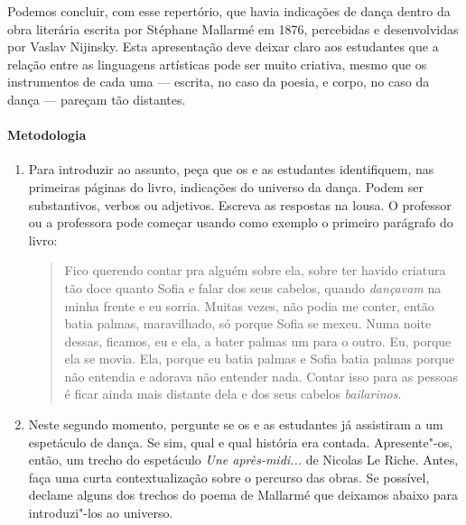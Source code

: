 \documentclass[12pt]{extarticle}
\begin{document}
Podemos concluir, com esse repertório, que havia indicações de dança dentro da
obra literária escrita por Stéphane Mallarmé em 1876, percebidas e desenvolvidas
por Vaslav Nijinsky. Esta apresentação deve deixar
claro aos estudantes que a relação entre as linguagens artísticas pode
ser muito criativa, mesmo que os instrumentos de cada uma --- escrita, no caso
da poesia, e corpo, no caso da dança --- pareçam tão distantes.

\paragraph{Metodologia}

\begin{enumerate}

  \item
  Para introduzir ao assunto, peça que os e as estudantes identifiquem, nas primeiras
  páginas do livro, indicações do universo da dança. Podem ser substantivos, verbos ou adjetivos. 
  Escreva as respostas na lousa. O professor ou a professora pode começar usando como exemplo
  o primeiro parágrafo do livro:

  \begin{quote}
  Fico querendo contar pra alguém sobre ela,
sobre ter havido criatura tão doce quanto Sofia e falar
dos seus cabelos, quando \emph{dançavam} na minha frente e
eu sorria. Muitas vezes, não podia me conter, então batia
palmas, maravilhado, só porque Sofia se mexeu. Numa
noite dessas, ficamos, eu e ela, a bater palmas um para o
outro. Eu, porque ela se movia. Ela, porque eu batia palmas e 
Sofia batia palmas porque não entendia e adorava
não entender nada. Contar isso para as pessoas é ficar ainda 
mais distante dela e dos seus cabelos \emph{bailarinos}.
\end{quote}


  \item
  Neste segundo momento, pergunte se os e as estudantes já assistiram a um
  espetáculo de dança. Se sim, qual e qual história era contada. 
  Apresente"-os, então, um trecho do espetáculo \textit{Une après-midi...}
  de Nicolas Le Riche. Antes, faça uma curta 
  contextualização sobre o percurso das obras. Se possível, declame
  alguns dos trechos do poema de Mallarmé que deixamos abaixo para introduzi"-los
  ao universo. 





\end{enumerate}
\end{document}
